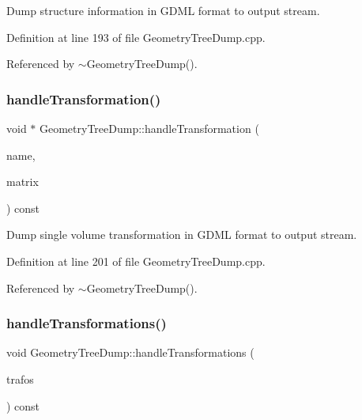 Dump structure information in G\+D\+ML format to output stream. 



Definition at line 193 of file Geometry\+Tree\+Dump.\+cpp.



Referenced by $\sim$\+Geometry\+Tree\+Dump().

\hypertarget{class_d_d4hep_1_1_geometry_1_1_geometry_tree_dump_aa7d24d8560d19592d2547688f7c0e83e}{}\label{class_d_d4hep_1_1_geometry_1_1_geometry_tree_dump_aa7d24d8560d19592d2547688f7c0e83e} 
\subsubsection{\texorpdfstring{handle\+Transformation()}{handleTransformation()}}
{\footnotesize\ttfamily void $\ast$ Geometry\+Tree\+Dump\+::handle\+Transformation (\begin{DoxyParamCaption}\item[{const std\+::string \&}]{name,  }\item[{const T\+Geo\+Matrix $\ast$}]{matrix }\end{DoxyParamCaption}) const\hspace{0.3cm}{\ttfamily [virtual]}}



Dump single volume transformation in G\+D\+ML format to output stream. 



Definition at line 201 of file Geometry\+Tree\+Dump.\+cpp.



Referenced by $\sim$\+Geometry\+Tree\+Dump().

\hypertarget{class_d_d4hep_1_1_geometry_1_1_geometry_tree_dump_a09e0fc8cabe8ac49f95f534653b410b8}{}\label{class_d_d4hep_1_1_geometry_1_1_geometry_tree_dump_a09e0fc8cabe8ac49f95f534653b410b8} 
\subsubsection{\texorpdfstring{handle\+Transformations()}{handleTransformations()}}
{\footnotesize\ttfamily void Geometry\+Tree\+Dump\+::handle\+Transformations (\begin{DoxyParamCaption}\item[{const \hyperlink{class_d_d4hep_1_1_geometry_1_1_geo_handler_types_aa52b3113e87db04c37666e85a9b5e569}{Transform\+Set} \&}]{trafos }\end{DoxyParamCaption}) const\hspace{0.3cm}{\ttfamily [virtual]}}



